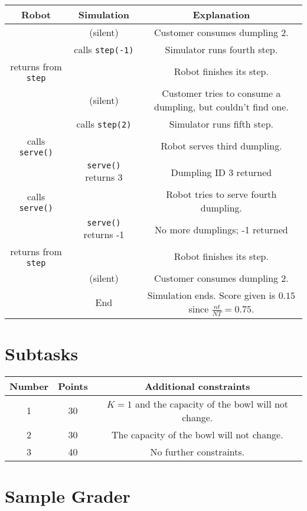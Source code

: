 \documentclass{article}
\begin{document}
\begin{tabular}{ccc}
Robot & Simulation & Explanation \\
\hline
 & (silent) & Customer consumes dumpling 2. \\
 & calls {\tt step(-1)} & Simulator runs fourth step. \\
returns from {\tt step} & & Robot finishes its step. \\
 & (silent) & Customer tries to consume a dumpling, but couldn't find one. \\
 & calls {\tt step(2)} & Simulator runs fifth step. \\
calls {\tt serve()} & & Robot serves third dumpling. \\
 & {\tt serve()} returns 3 & Dumpling ID 3 returned \\
calls {\tt serve()} & & Robot tries to serve fourth dumpling. \\
 & {\tt serve()} returns -1 & No more dumplings; -1 returned \\
returns from {\tt step} & & Robot finishes its step. \\
 & (silent) & Customer consumes dumpling 2. \\
 & End & Simulation ends. Score given is $0.15$ since $\frac{nt}{NT} = 0.75$.
\end{tabular}

\section*{Subtasks}
\begin{tabular}{ccc}
Number & Points & Additional constraints \\
\hline
1 & 30 & $K = 1$ and the capacity of the bowl will not change. \\
2 & 30 & The capacity of the bowl will not change. \\
3 & 40 & No further constraints.
\end{tabular}

\section*{Sample Grader}
\end{document}
